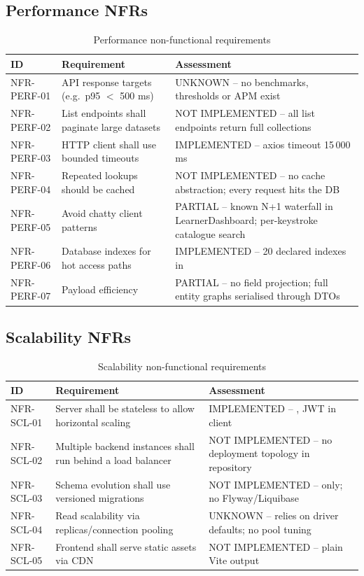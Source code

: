 \subsection{Performance NFRs}
\begin{table}[H]
\centering
\caption{Performance non-functional requirements}
\label{tab:nfr-performance}
\begin{tabular}{@{}C{1.4cm}L{8.8cm}L{3.8cm}@{}}
\toprule
\textbf{ID} & \textbf{Requirement} & \textbf{Assessment} \\
\midrule
NFR-PERF-01 & API response targets (e.g.\ p95 $<$ 500 ms) & UNKNOWN -- no benchmarks, thresholds or APM exist \\
NFR-PERF-02 & List endpoints shall paginate large datasets & NOT IMPLEMENTED -- all list endpoints return full collections \\
NFR-PERF-03 & HTTP client shall use bounded timeouts & IMPLEMENTED -- axios timeout 15\,000 ms \\
NFR-PERF-04 & Repeated lookups should be cached & NOT IMPLEMENTED -- no cache abstraction; every request hits the DB \\
NFR-PERF-05 & Avoid chatty client patterns & PARTIAL -- known N+1 waterfall in LearnerDashboard; per-keystroke catalogue search \\
NFR-PERF-06 & Database indexes for hot access paths & IMPLEMENTED -- 20 declared indexes in  \\
NFR-PERF-07 & Payload efficiency & PARTIAL -- no field projection; full entity graphs serialised through DTOs \\
\bottomrule
\end{tabular}
\end{table}

\subsection{Scalability NFRs}
\begin{table}[H]
\centering
\caption{Scalability non-functional requirements}
\label{tab:nfr-scalability}
\begin{tabular}{@{}C{1.4cm}L{8.8cm}L{3.8cm}@{}}
\toprule
\textbf{ID} & \textbf{Requirement} & \textbf{Assessment} \\
\midrule
NFR-SCL-01 & Server shall be stateless to allow horizontal scaling & IMPLEMENTED -- , JWT in client \\
NFR-SCL-02 & Multiple backend instances shall run behind a load balancer & NOT IMPLEMENTED -- no deployment topology in repository \\
NFR-SCL-03 & Schema evolution shall use versioned migrations & NOT IMPLEMENTED --  only; no Flyway/Liquibase \\
NFR-SCL-04 & Read scalability via replicas/connection pooling & UNKNOWN -- relies on driver defaults; no pool tuning \\
NFR-SCL-05 & Frontend shall serve static assets via CDN & NOT IMPLEMENTED -- plain Vite  output \\
\bottomrule
\end{tabular}
\end{table}

